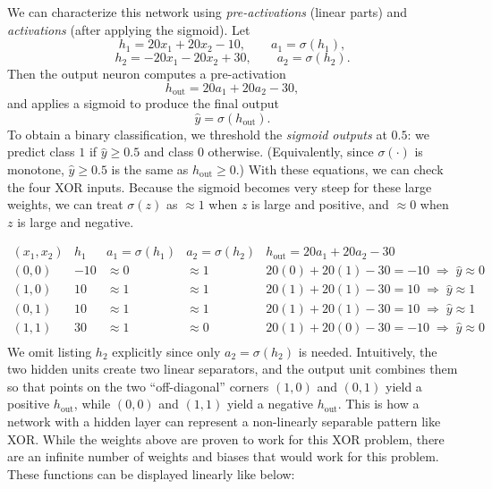 \documentclass{article}
\begin{document}
We can characterize this network using \emph{pre-activations} (linear parts) and \emph{activations} (after applying the sigmoid). Let
\[
h_1 = 20x_1 + 20x_2 - 10,\qquad a_1 = \sigma(h_1),
\]
\[
h_2 = -20x_1 - 20x_2 + 30,\qquad a_2 = \sigma(h_2).
\]
Then the output neuron computes a pre-activation
\[
h_{\text{out}} = 20a_1 + 20a_2 - 30,
\]
and applies a sigmoid to produce the final output
\[
\hat{y} = \sigma(h_{\text{out}}).
\]
\newline
\newline
To obtain a binary classification, we threshold the \emph{sigmoid outputs} at \(0.5\): we predict class \(1\) if \(\hat{y}\ge 0.5\) and class \(0\) otherwise. (Equivalently, since \(\sigma(\cdot)\) is monotone, \(\hat{y}\ge 0.5\) is the same as \(h_{\text{out}} \ge 0\).)
\newline
\newline
With these equations, we can check the four XOR inputs. Because the sigmoid becomes very steep for these large weights, we can treat \(\sigma(z)\) as \(\approx 1\) when \(z\) is large and positive, and \(\approx 0\) when \(z\) is large and negative.

\[
\begin{array}{c|c|c|c|c}
(x_1,x_2) & h_1 & a_1=\sigma(h_1) & a_2=\sigma(h_2) & h_{\text{out}}=20a_1+20a_2-30 \\
\hline
(0,0) & -10 & \approx 0 & \approx 1 & 20(0)+20(1)-30=-10\;\Rightarrow\;\hat{y}\approx 0 \\
(1,0) & 10  & \approx 1 & \approx 1 & 20(1)+20(1)-30=10\;\Rightarrow\;\hat{y}\approx 1 \\
(0,1) & 10  & \approx 1 & \approx 1 & 20(1)+20(1)-30=10\;\Rightarrow\;\hat{y}\approx 1 \\
(1,1) & 30  & \approx 1 & \approx 0 & 20(1)+20(0)-30=-10\;\Rightarrow\;\hat{y}\approx 0 \\
\end{array}
\]
We omit listing $h_2$ explicitly since only $a_2 = \sigma(h_2)$ is needed.
\newline
Intuitively, the two hidden units create two linear separators, and the output unit combines them so that points on the two ``off-diagonal'' corners \((1,0)\) and \((0,1)\) yield a positive \(h_{\text{out}}\), while \((0,0)\) and \((1,1)\) yield a negative \(h_{\text{out}}\). This is how a network with a hidden layer can represent a non-linearly separable pattern like XOR.
\newline
While the weights above are proven to work for this XOR problem, there are an infinite number of weights and biases that would work for this problem. These functions can be displayed linearly like below:
\end{document}
